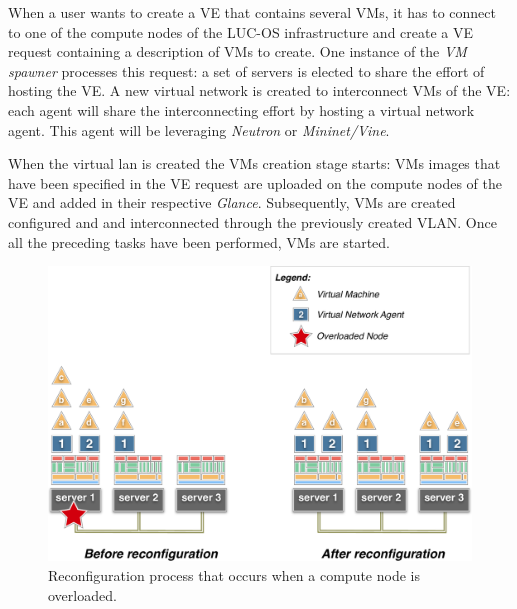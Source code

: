 When a user wants to create a VE that contains several VMs, it has to connect to
one of the compute nodes of the LUC-OS infrastructure and create a VE request
containing a description of VMs to create. One instance of the \emph{VM spawner}
processes this request: a set of servers is elected to share the effort of 
hosting the VE. A new virtual network is created to interconnect VMs of the VE:
each agent will share the interconnecting effort by hosting a virtual network 
agent. This agent will be leveraging \emph{Neutron} or \emph{Mininet/Vine}.

When the virtual lan is created the VMs creation stage starts: VMs images that 
have been specified in the VE request are uploaded on the compute nodes of the 
VE and added in their respective \emph{Glance}. Subsequently, VMs are created 
configured and and interconnected through the previously created VLAN. Once all
the preceding tasks have been performed, VMs are started.

\begin{figure}
	\centerline{
	 \includegraphics[width=1.0\linewidth]{Figures/lucos_reconfiguration.pdf}
  }
	\caption{Reconfiguration process that occurs when a compute node is 
	overloaded.}%
	\label{fig:lucos_reconfiguration}%
\end{figure}

